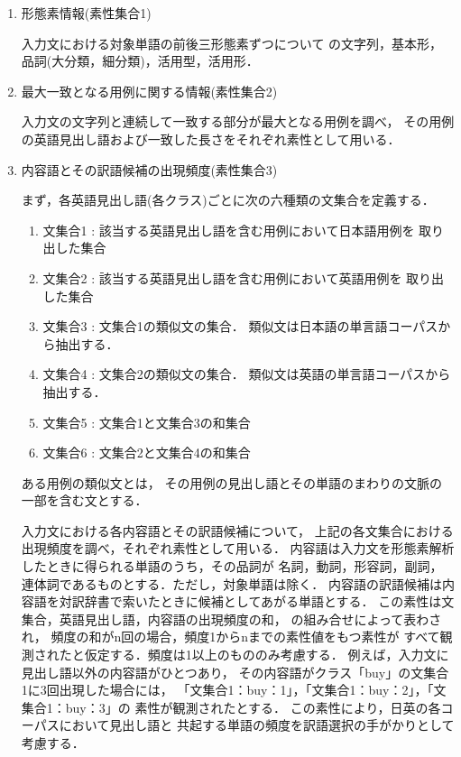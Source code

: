 \begin{enumerate}
\item 形態素情報(素性集合1)

  入力文における対象単語の前後三形態素ずつについて
  の文字列，基本形，品詞(大分類，細分類)，活用型，活用形．

\item 最大一致となる用例に関する情報(素性集合2)

  入力文の文字列と連続して一致する部分が最大となる用例を調べ，
  その用例の英語見出し語および一致した長さをそれぞれ素性として用いる．

\item 内容語とその訳語候補の出現頻度(素性集合3)

  まず，各英語見出し語(各クラス)ごとに次の六種類の文集合を定義する．
  \begin{enumerate}
  \item 文集合1 : 該当する英語見出し語を含む用例において日本語用例を
    取り出した集合
  \item 文集合2 : 該当する英語見出し語を含む用例において英語用例を
    取り出した集合
  \item 文集合3 : 文集合1の類似文の集合．
    類似文は日本語の単言語コーパスから抽出する．
  \item 文集合4 : 文集合2の類似文の集合．
    類似文は英語の単言語コーパスから抽出する．
  \item 文集合5 : 文集合1と文集合3の和集合
  \item 文集合6 : 文集合2と文集合4の和集合
  \end{enumerate}

  ある用例の類似文とは，
  その用例の見出し語とその単語のまわりの文脈の一部を含む文とする．

  入力文における各内容語とその訳語候補について，
  上記の各文集合における出現頻度を調べ，それぞれ素性として用いる．
  内容語は入力文を形態素解析したときに得られる単語のうち，その品詞が
  名詞，動詞，形容詞，副詞，連体詞であるものとする．ただし，対象単語は除く．
  内容語の訳語候補は内容語を対訳辞書で索いたときに候補としてあがる単語とする．
  この素性は文集合，英語見出し語，内容語の出現頻度の和，
  の組み合せによって表わされ，
  頻度の和がn回の場合，頻度1からnまでの素性値をもつ素性が
  すべて観測されたと仮定する．頻度は1以上のもののみ考慮する．
  例えば，入力文に見出し語以外の内容語がひとつあり，
  その内容語がクラス「buy」の文集合1に3回出現した場合には，
  「文集合1：buy：1」，「文集合1：buy：2」，「文集合1：buy：3」の
  素性が観測されたとする．
  この素性により，日英の各コーパスにおいて見出し語と
  共起する単語の頻度を訳語選択の手がかりとして考慮する．
\end{enumerate}

